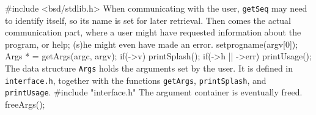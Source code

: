#include <bsd/stdlib.h>
\nwendcode{}\nwdocspar
When communicating with the user, \texttt{getSeq} may need to identify
itself, so its name is set for later retrieval. Then comes the actual
communication part, where a user might have requested information
about the program, or help; (s)he might even have made an error.
\nwenddocs{}\endmoddef\nwstartdeflinemarkup{}\nwenddeflinemarkup
setprogname(argv[0]);
Args * = getArgs(argc, argv);
if(->v)
  printSplash();
if(->h || ->err)
  printUsage();
\nwendcode{}\nwdocspar
The data structure \texttt{Args} holds the arguments set by the
user. It is defined in \texttt{interface.h}, together with the
functions \texttt{getArgs}, \texttt{printSplash}, and
\texttt{printUsage}.
\nwenddocs{}\plusendmoddef\nwstartdeflinemarkup{}\nwenddeflinemarkup
#include "interface.h"
\nwendcode{}\nwdocspar
The argument container is eventually freed.
\nwenddocs{}\endmoddef\nwstartdeflinemarkup{}\nwenddeflinemarkup
freeArgs();
\nwendcode{}\nwdocspar
